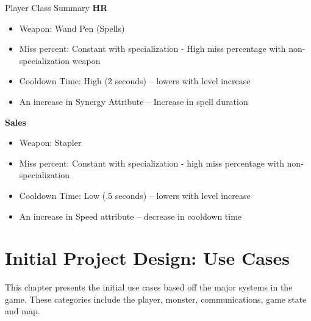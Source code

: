 \documentclass[12pt]{report}
\begin{document}
\begin{chapter}{Player Class Summary}
	\textbf{\large{HR}}
	\begin{itemize}
  	 \item Weapon: Wand Pen (Spells)
  	 \item Miss percent: Constant with specialization - High miss percentage with non-specialization weapon
  	 \item Cooldown Time: High (2 seconds) -- lowers with level increase
  	 \item An increase in Synergy Attribute -- Increase in spell duration\\
	\end{itemize}

	\textbf{\large{Sales}}
	\begin{itemize}
  	 \item Weapon: Stapler
  	 \item Miss percent: Constant with specialization - high miss percentage with non-specialization 
  	 \item Cooldown Time: Low (.5 seconds) -- lowers with level increase
  	 \item An increase in Speed attribute -- decrease in cooldown time
	\end{itemize}
\end{chapter}


\chapter{Initial Project Design: Use Cases}
This chapter presents the initial use cases based off the major systems in the game. These categories
include the player, monster, communications, game state and map.
  
\end{document}

